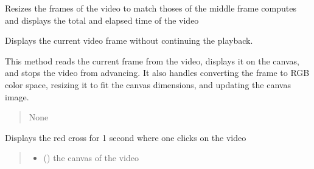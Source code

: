\documentclass[letterpaper,10pt,english]{sphinxmanual}
\begin{document}
\begin{fulllineitems}
\begin{fulllineitems}
\sphinxAtStartPar
Resizes the frames of the video to match thoses  of the middle frame
computes and displays the total and elapsed time of the video

\end{fulllineitems}


\begin{fulllineitems}
\label{\detokenize{general_interface:general_interface.LecteurVideo.afficher_video_frame}}
\pysigstartsignatures
{}
\pysigstopsignatures
\sphinxAtStartPar
Displays the current video frame without continuing the playback.

\sphinxAtStartPar
This method reads the current frame from the video, displays it on the canvas, and
stops the video from advancing. It also handles converting the frame to RGB color
space, resizing it to fit the canvas dimensions, and updating the canvas image.
\begin{quote}\begin{description}
\sphinxAtStartPar
{} \textendash{} 

\sphinxAtStartPar
None

\sphinxAtStartPar
{} \textendash{} 

\end{description}\end{quote}

\end{fulllineitems}


\begin{fulllineitems}
\label{\detokenize{general_interface:general_interface.LecteurVideo.ajouter_plus_rouge}}
\pysigstartsignatures
{}
\pysigstopsignatures
\sphinxAtStartPar
Displays the red cross for 1 second where one clicks on the video
\begin{quote}\begin{description}
\begin{itemize}
\item {} 
\sphinxAtStartPar
{} () \textendash{} the canvas of the video


\end{itemize}
\end{description}
\end{quote}
\end{fulllineitems}
\end{fulllineitems}
\end{document}
